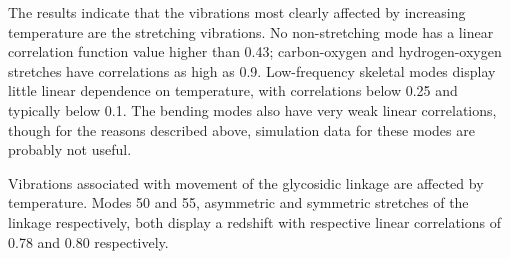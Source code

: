 The results indicate that the vibrations most clearly affected by increasing temperature are the stretching vibrations. No non-stretching mode has a linear correlation function value higher than 0.43; carbon-oxygen and hydrogen-oxygen stretches have correlations as high as 0.9.	Low-frequency skeletal modes display little linear dependence on temperature, with correlations below 0.25 and typically below 0.1. The bending modes also have very weak linear correlations, though for the reasons described above, simulation data for these modes are probably not useful.

Vibrations associated with movement of the glycosidic linkage are affected by temperature. Modes 50 and 55, asymmetric and symmetric stretches of the linkage respectively, both display a redshift with respective linear correlations of 0.78 and 0.80 respectively.